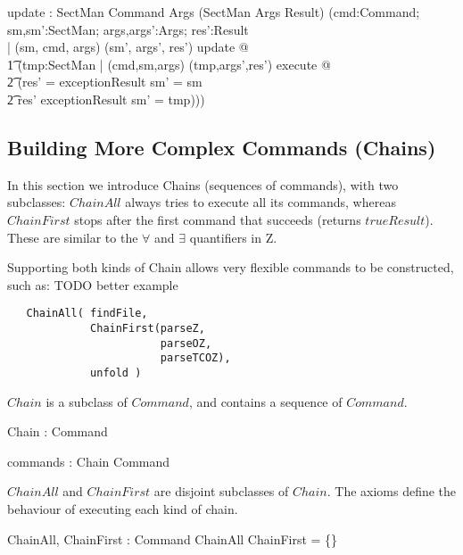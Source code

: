 \documentclass{llncs} %
\begin{document}
\begin{axdef}
  update : SectMan \cross Command \cross Args 
       \fun (SectMan \cross Args \cross Result)
\where
  (\forall cmd:Command; sm,sm':SectMan; args,args':Args; res':Result\\
  | (sm, cmd, args) \mapsto (sm', args', res') \in update @ \\
  \t1 (\exists tmp:SectMan 
           | (cmd,sm,args) \mapsto (tmp,args',res') \in execute @\\
  \t2   (res' = exceptionResult \land sm' = sm \lor \\
  \t2   \: res' \neq exceptionResult \land sm' = tmp)))
\end{axdef}


\subsection{Building More Complex Commands (Chains)}

In this section we introduce Chains (sequences of commands),
with two subclasses: $ChainAll$ always tries to execute
all its commands, whereas $ChainFirst$ stops after the first
command that succeeds (returns $trueResult$).  These are similar to the
$\forall$ and $\exists$ quantifiers in Z.

Supporting both kinds of Chain allows very flexible commands
to be constructed, such as:  TODO better example
\begin{verbatim}
   ChainAll( findFile, 
             ChainFirst(parseZ, 
                        parseOZ,
                        parseTCOZ), 
             unfold )
\end{verbatim}

$Chain$ is a subclass of $Command$, and contains a sequence of $Command$.
\begin{axdef}
  Chain : \power Command
\end{axdef}

\begin{axdef}
  commands : Chain \fun \seq Command
\end{axdef}

$ChainAll$ and $ChainFirst$ are disjoint subclasses of $Chain$.
The axioms define the behaviour of executing each kind of chain.
\begin{axdef}
  ChainAll, ChainFirst : \power Command
\where
  ChainAll \cap ChainFirst = \{\}
\end{axdef}
\end{document}
